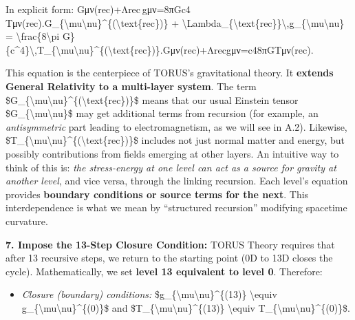 \documentclass[
]{article}
\begin{document}
In explicit form:
Gμν(rec)+Λrec gμν=8πGc4 Tμν(rec).G\_\{\textbackslash mu\textbackslash nu\}\^{}\{(\textbackslash text\{rec\})\}
+
\textbackslash Lambda\_\{\textbackslash text\{rec\}\}\textbackslash,g\_\{\textbackslash mu\textbackslash nu\}
= \textbackslash frac\{8\textbackslash pi
G\}\{c\^{}4\}\textbackslash,T\_\{\textbackslash mu\textbackslash nu\}\^{}\{(\textbackslash text\{rec\})\}.Gμν(rec)\hspace{0pt}+Λrec\hspace{0pt}gμν\hspace{0pt}=c48πG\hspace{0pt}Tμν(rec)\hspace{0pt}.

This equation is the centerpiece of TORUS's gravitational theory. It
\textbf{extends General Relativity to a multi-layer system}. The term
\$G\_\{\textbackslash mu\textbackslash nu\}\^{}\{(\textbackslash text\{rec\})\}\$
means that our usual Einstein tensor
\$G\_\{\textbackslash mu\textbackslash nu\}\$ may get additional terms
from recursion (for example, an \emph{antisymmetric} part leading to
electromagnetism, as we will see in A.2). Likewise,
\$T\_\{\textbackslash mu\textbackslash nu\}\^{}\{(\textbackslash text\{rec\})\}\$
includes not just normal matter and energy, but possibly contributions
from fields emerging at other layers. An intuitive way to think of this
is: \emph{the stress-energy at one level can act as a source for gravity
at another level}, and vice versa, through the linking recursion. Each
level's equation provides \textbf{boundary conditions or source terms
for the next}\hspace{0pt}. This interdependence is what we mean by
``structured recursion'' modifying spacetime curvature.

\textbf{7. Impose the 13-Step Closure Condition:} TORUS Theory requires
that after 13 recursive steps, we return to the starting point (0D to
13D closes the cycle). Mathematically, we set \textbf{level 13
equivalent to level 0}. Therefore:

\begin{itemize}
\item
  \emph{Closure (boundary) conditions:}
  \$g\_\{\textbackslash mu\textbackslash nu\}\^{}\{(13)\}
  \textbackslash equiv
  g\_\{\textbackslash mu\textbackslash nu\}\^{}\{(0)\}\$ and
  \$T\_\{\textbackslash mu\textbackslash nu\}\^{}\{(13)\}
  \textbackslash equiv
  T\_\{\textbackslash mu\textbackslash nu\}\^{}\{(0)\}\$\hspace{0pt}.
\end{itemize}
\end{document}
